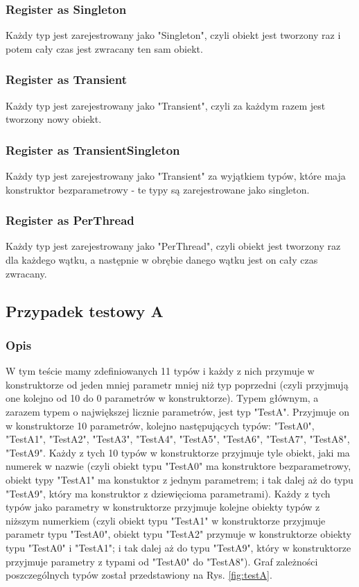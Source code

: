 \documentclass[12pt]{article}
\begin{document}
\subsubsection{Register as Singleton}
Każdy typ jest zarejestrowany jako "Singleton", czyli obiekt jest tworzony raz i potem cały czas jest zwracany ten sam obiekt.

\subsubsection{Register as Transient}
Każdy typ jest zarejestrowany jako "Transient", czyli za każdym razem jest tworzony nowy obiekt.

\subsubsection{Register as TransientSingleton}
Każdy typ jest zarejestrowany jako "Transient" za wyjątkiem typów, które maja konstruktor bezparametrowy - te typy są zarejestrowane jako singleton.

\subsubsection{Register as PerThread}
Każdy typ jest zarejestrowany jako "PerThread", czyli obiekt jest tworzony raz dla każdego wątku, a następnie w obrębie danego wątku jest on cały czas zwracany.

\subsection{Przypadek testowy A}
\subsubsection{Opis}
W tym teście mamy zdefiniowanych 11 typów i każdy z nich przymuje w konstruktorze od jeden mniej parametr mniej niż typ poprzedni (czyli przyjmują one kolejno od 10 do 0 parametrów w konstruktorze). Typem głównym, a zarazem typem o największej licznie parametrów, jest typ "TestA". Przyjmuje on w konstruktorze 10 parametrów, kolejno następujących typów: "TestA0", "TestA1", "TestA2", "TestA3", "TestA4", "TestA5", "TestA6", "TestA7", "TestA8", "TestA9". Każdy z tych 10 typów w konstruktorze przyjmuje tyle obiekt, jaki ma numerek w nazwie (czyli obiekt typu "TestA0" ma konstruktore bezparametrowy, obiekt typy "TestA1" ma konstuktor z jednym parametrem; i tak dalej aż do typu "TestA9", który ma konstruktor z dziewięcioma parametrami). Każdy z tych typów jako parametry w konstruktorze przyjmuje kolejne obiekty typów z niższym numerkiem (czyli obiekt typu "TestA1" w konstruktorze przyjmuje parametr typu "TestA0", obiekt typu "TestA2" przymuje w konstruktorze obiekty typu "TestA0" i "TestA1";  i tak dalej aż do typu "TestA9", który w konstruktorze przyjmuje parametry z typami od "TestA0" do "TestA8"). Graf zależności poszczególnych typów został przedstawiony na Rys. \ref{fig:testA}.\\
\end{document}
